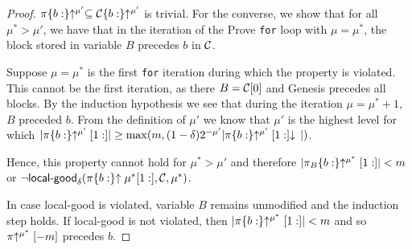 \begin{proof}
    $\pi\{b:\}\negthickspace\uparrow^{\mu'} \subseteq \mathcal{C}\{b:\}\negthickspace\uparrow^{\mu'}$ is trivial.
    For the converse, we show that for all $\mu^* > \mu'$, we have that in
    the iteration of the Prove \texttt{for} loop with $\mu = \mu^*$, the block
    stored in variable $B$ precedes $b$ in $\mathcal{C}$.

    Suppose $\mu = \mu^*$ is the first \texttt{for} iteration during which the
    property is violated. This cannot be the first iteration, as there
    $B = \mathcal{C}[0]$ and Genesis precedes all blocks. By the
    induction hypothesis we see that during the iteration $\mu = \mu^* + 1$,
    $B$ preceded $b$. From the definition of $\mu'$ we know
    that $\mu'$ is the highest level for which
    $|\pi\{b:\}\negthickspace\uparrow^{\mu'}[1:]|
    \geq \max(m, (1 -
    \delta)2^{-\mu'}|\pi\{b:\}\negthickspace\uparrow^{\mu'}[1:]\negthickspace\downarrow\,|)$.

    Hence, this
    property cannot hold for $\mu^* > \mu'$ and therefore
    $|\pi_B\{b:\}\negthickspace\uparrow^{\mu^*}[1:]| < m$ or $\lnot
    \textsf{local-good}_\delta(\pi\{b:\}\negthickspace\uparrow{\mu^*}[1:], \mathcal{C}, \mu^*)$.

    In case \textsf{local-good} is violated, variable $B$ remains unmodified and
    the induction step holds. If \textsf{local-good} is not violated, then
    $|\pi\{b:\}\negthickspace\uparrow^{\mu^*}[1:]| < m$ and so $\pi\negthickspace\uparrow^{\mu^*}[-m]$
    precedes $b$.
    \Qed
\end{proof}
